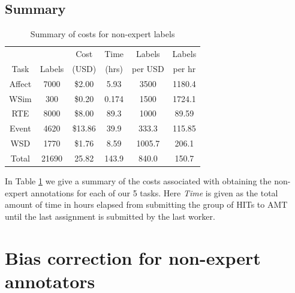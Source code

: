 \documentclass[11pt]{article}
\begin{document}

\subsection{ Summary }

\begin{table}[h]
\footnotesize
    \begin{center}
        \begin{tabular}{|c||c|c|c|c|c|}
        \hline
        & & Cost & Time & Labels & Labels \\
        Task & Labels  & (USD) & (hrs) & per USD & per hr \\
        \hline
        Affect & 7000 & \$2.00 & 5.93 & 3500 & 1180.4 \\
        WSim & 300 & \$0.20 & 0.174 & 1500 & 1724.1 \\
        RTE & 8000 & \$8.00 & 89.3 & 1000 & 89.59 \\
        Event & 4620 & \$13.86 & 39.9 & 333.3 & 115.85 \\
        WSD & 1770 & \$1.76 & 8.59 & 1005.7 & 206.1  \\
        \hline
        Total & 21690 & 25.82 & 143.9 & 840.0 & 150.7 \\
        \hline
        \end{tabular}
    \caption{Summary of costs for non-expert labels}\label{costs}
\end{center}
\end{table}

In Table \ref{costs} we give a summary of the costs associated with
obtaining the non-expert annotations for each of our 5 tasks.  Here
\textit{Time} is given as the total amount of time in hours elapsed
from submitting the group of HITs to AMT until the last assignment
is submitted by the last worker.  %

\section{ Bias correction for non-expert annotators  }
\end{document}
